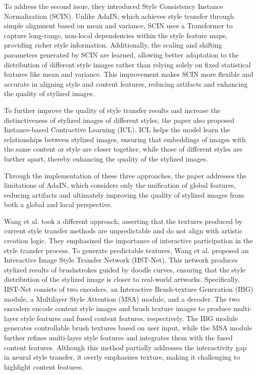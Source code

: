 To address the second issue, they introduced Style Consistency Instance Normalization (SCIN). Unlike AdaIN, which achieves style transfer through simple alignment based on mean and variance, SCIN uses a Transformer to capture long-range, non-local dependencies within the style feature maps, providing richer style information. Additionally, the scaling and shifting parameters generated by SCIN are learned, allowing better adaptation to the distribution of different style images rather than relying solely on fixed statistical features like mean and variance. This improvement makes SCIN more flexible and accurate in aligning style and content features, reducing artifacts and enhancing the quality of stylized images.

To further improve the quality of style transfer results and increase the distinctiveness of stylized images of different styles, the paper also proposed Instance-based Contractive Learning (ICL). ICL helps the model learn the relationships between stylized images, ensuring that embeddings of images with the same content or style are closer together, while those of different styles are further apart, thereby enhancing the quality of the stylized images.

Through the implementation of these three approaches, the paper addresses the limitations of AdaIN\citep{04huang2017arbitrary}, which considers only the unification of global features, reducing artifacts and ultimately improving the quality of stylized images from both a global and local perspective.

Wang et al.\citep{52wang2023interactive} took a different approach, asserting that the textures produced by current style transfer methods are unpredictable and do not align with artistic creation logic. They emphasized the importance of interactive participation in the style transfer process. To generate predictable textures, Wang et al. proposed an Interactive Image Style Transfer Network (IIST-Net). This network produces stylized results of brushstrokes guided by doodle curves, ensuring that the style distribution of the stylized image is closer to real-world artworks. Specifically, IIST-Net consists of two encoders, an Interactive Brush-texture Generation (IBG) module, a Multilayer Style Attention (MSA) module, and a decoder. The two encoders encode content style images and brush texture images to produce multi-layer style features and fused content features, respectively. The IBG module generates controllable brush textures based on user input, while the MSA module further refines multi-layer style features and integrates them with the fused content features. Although this method partially addresses the interactivity gap in neural style transfer, it overly emphasizes texture, making it challenging to highlight content features.

